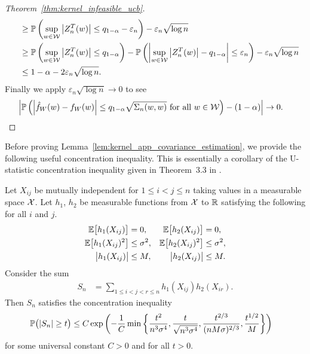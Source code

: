 \begin{proof}[Theorem~\ref{thm:kernel_infeasible_ucb}]
\begin{align*}
    &\quad\geq
    \P\left(
      \sup_{w \in \cW}
      \left| Z_n^T(w) \right|
      \leq
      q_{1-\alpha}
      - \varepsilon_n
    \right)
    - \varepsilon_n \sqrt{\log n} \\
    &\quad\geq
    \P\left(
      \sup_{w \in \cW}
      \left|
      Z_n^T(w)
      \right|
      \leq
      q_{1-\alpha}
    \right)
    - \P\left(
      \left|
      \sup_{w \in \cW}
      \big| Z_n^T(w) \big|
      - q_{1-\alpha}
      \right|
      \leq \varepsilon_n
    \right)
    - \varepsilon_n \sqrt{\log n} \\
    &\quad\leq
    1 - \alpha
    - 2 \varepsilon_n \sqrt{\log n}.
  \end{align*}
  Finally we apply $\varepsilon_n \sqrt{\log n} \to 0$
  to see
  \begin{align*}
    \left|
    \P\left(
      \left|
      \hat f_W(w) - f_W(w)
      \right|
      \leq
      q_{1-\alpha}
      \sqrt{\Sigma_n(w,w)}
      \textup{ for all }
      w \in \cW
    \right)
    - (1 - \alpha)
    \right|
    &\to 0.
  \end{align*}
\end{proof}

Before proving
Lemma~\ref{lem:kernel_app_covariance_estimation},
we provide the following useful
concentration inequality.
This is essentially a corollary of the
U-statistic concentration inequality given in
Theorem~3.3 in \citet{gine2000exponential}.

\begin{lemma}
  \label{lem:kernel_app_dyadic_concentration}

  Let $X_{i j}$ be mutually independent for $1 \leq i < j \leq n$
  taking values in a measurable space $\cX$.
  Let $h_1$, $h_2$ be measurable functions from $\cX$ to $\R$
  satisfying the following for all $i$ and $j$.
  \begin{align*}
    \E\big[h_1(X_{i j})\big]
    &= 0,
    &\E\big[h_2(X_{i j})\big]
    &=0, \\
    \E\big[h_1(X_{i j})^2\big]
    &\leq \sigma^2,
    &\E\big[h_2(X_{i j})^2\big]
    &\leq \sigma^2, \\
    \big|h_1(X_{i j})\big|
    &\leq M,
    &\big|h_2(X_{i j})\big|
    &\leq M.
  \end{align*}
  Consider the sum
  \begin{align*}
    S_n
    &=
    \sum_{1 \leq i < j < r \leq n}
    h_1(X_{i j})
    h_2(X_{i r}).
  \end{align*}
  Then $S_n$ satisfies the concentration inequality
  \begin{align*}
    \P\big(
      |S_n| \geq t
    \big)
    &\leq
    C \exp\left(
      -\frac{1}{C}
      \min \left\{
        \frac{t^2}{n^3 \sigma^4},
        \frac{t}{\sqrt{n^3 \sigma^4}},
        \frac{t^{2/3}}{(n M \sigma)^{2/3}},
        \frac{t^{1/2}}{M}
      \right\}
    \right)
  \end{align*}
  for some universal constant
  $C > 0$
  and for all $t>0$.

\end{lemma}


